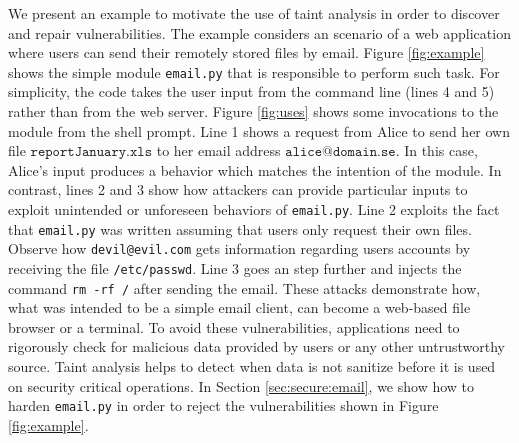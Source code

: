 \documentclass[oribibl]{llncs}
\begin{document}
We present an example to motivate the use of 
taint analysis in order to discover and repair 
vulnerabilities. 
The example considers an scenario of a web application
where users can send their remotely stored files by 
email.
Figure \ref{fig:example} shows the simple module \texttt{email.py}
that is responsible to perform such task.
For simplicity,
the code takes the user input from the 
command line (lines 4 and 5) rather than from 
the web server.
Figure \ref{fig:uses} shows some invocations to the module from the
shell prompt. Line 1 shows a request from 
Alice to send her own file $\texttt{reportJanuary.xls}$ to 
her email address $\texttt{alice@domain.se}$. In this case, 
Alice's input produces a behavior which matches the 
intention of the module. 
In contrast, lines 2 and 3 show how attackers can 
provide particular inputs to exploit unintended 
or unforeseen behaviors of \texttt{email.py}.
Line 2 exploits the fact that \texttt{email.py} 
was written assuming that 
users only request their own files. 
Observe how  
\texttt{devil@evil.com} gets information regarding 
users accounts by receiving the file \texttt{/etc/passwd}. 
Line 3 goes an step further 
and injects the command \texttt{rm -rf /} after sending the email.
These attacks demonstrate how, 
what was intended to be a simple email client,  
can become a web-based file browser or a terminal. To avoid 
these vulnerabilities, applications need to rigorously check 
for malicious data provided by users or any other 
untrustworthy source. 
Taint analysis helps to detect when 
data is not sanitize before it is used on security critical 
operations. In Section \ref{sec:secure:email}, we show how to harden 
\texttt{email.py} in order to reject the vulnerabilities 
shown in Figure \ref{fig:example}.
\end{document}

